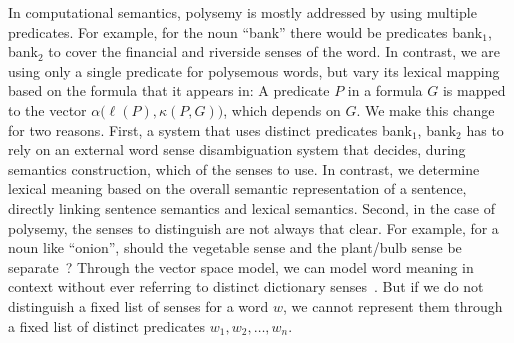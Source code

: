 In computational semantics, polysemy is mostly addressed by using multiple
predicates. For example, for the noun ``bank'' there would be predicates
bank$_1$, bank$_2$ to cover the financial and riverside senses of the word. In
contrast, we are using only a single predicate for polysemous words, but vary
its lexical mapping based on the formula that it appears in: A predicate $P$ in
a formula $G$ is mapped to the vector $\alpha\big(\ell(P), \kappa(P, G)\big)$,
which depends on $G$. We make this change for two reasons. First, a system that
uses distinct predicates bank$_1$, bank$_2$ has to rely on an external word
sense disambiguation system that decides, during semantics construction, which
of the senses to use. In contrast, we determine lexical meaning based on the
overall semantic representation of a sentence, directly linking sentence
semantics and lexical semantics. Second, in the case of polysemy, the senses to
distinguish are not always that clear. For example, for a noun like ``onion'',
should the vegetable sense and the plant/bulb sense be
separate~\citep{krishnamurthy:chj2000}? Through the vector space model, we
can model word meaning in context without ever referring to distinct dictionary
senses~\citep{erk:gems2010}. But if we do not distinguish a fixed list of senses
for a word $w$, we cannot represent them through a fixed list of distinct predicates
$w_1, w_2, \ldots, w_n$.

